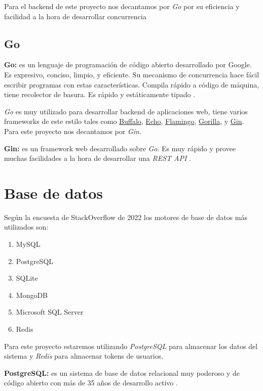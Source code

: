Para el backend de este proyecto nos decantamos por \textit{Go} por su eficiencia y facilidad a la hora de desarrollar concurrencia
\subsection{Go}
\textbf{Go:} es un lenguaje de programación de código abierto desarrollado por Google. Es expresivo, conciso, limpio, y eficiente. Su mecanismo de concurrencia hace fácil escribir programas con estas características. Compila rápido a código de máquina, tiene recolector de basura. Es rápido y estáticamente tipado \cite{golang}.
\newline

\textit{Go} es muy utilizado para desarrollar backend de aplicaciones web, tiene varios frameworks de este estilo tales como \href{https://gobuffalo.io/en/}{Buffalo}, \href{https://echo.labstack.com/}{Echo}, \href{https://www.flamingo.me/}{Flamingo}, \href{http://www.gorillatoolkit.org/}{Gorilla}, y \href{https://gin-gonic.com/}{Gin}. Para este proyecto nos decantamos por \textit{Gin}.
\newline

\textbf{Gin:} es un framework web desarrollado sobre \textit{Go}. Es muy rápido y provee muchas facilidades a la hora de desarrollar una \textit{REST API} \cite{gin}.

\section{Base de datos}
Según la encuesta de StackOverflow de 2022 \cite{encuesta2022} los motores de base de datos más utilizados son:
\begin{enumerate}
	\item MySQL
	\item PostgreSQL
	\item SQLite
	\item MongoDB
	\item Microsoft SQL Server
	\item Redis
\end{enumerate}

Para este proyecto estaremos utilizando \textit{PostgreSQL} para almacenar los datos del sistema y \textit{Redis} para almacenar tokens de usuarios.
\newline

\textbf{PostgreSQL:} es un sistema de base de datos relacional muy poderoso y de código abierto con más de 35 años de desarrollo activo \cite{postgres}.
\newline

